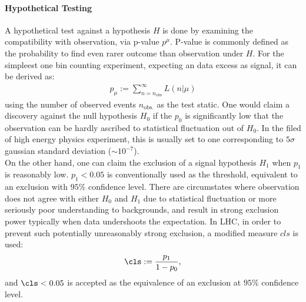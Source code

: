 \paragraph{Hypothetical Testing}
A hypothetical test against a hypothesis $H$ is done by examining the compatibility with observation, via p-value $p^\mu$.
P-value is commonly defined as the probability to find even rarer outcome than observation under $H$. 
For the simpleest one bin counting experiment, expecting an data excess as signal, it can be derived as:
\begin{align}
p_\mu := \sum_{n=n_{\mathrm{obs}}}^{\infty} L(n|\mu) 
\end{align}
using the number of observed events $n_{\mathrm{obs.}}$ as the test static.
One would claim a discovery against the null hypothesis $H_0$ if the $p_0$ is significantly low that the observation can be hardly ascribed to statistical fluctuation out of $H_0$. In the filed of high energy physics experiment, this is usually set to one corresponding to $5\sigma$ gaussian standard deviation ($\sim 10^{-7}$). \\

On the other hand, one can claim the exclusion of a signal hypothesis $H_1$ when $p_1$ is reasonably low. $p_1<0.05$ is conventionally used as the threshold, equivalent to an exclusion with $95\%$ confidence level. There are circumstates where observation does not agree with either $H_0$ and $H_1$ due to statistical fluctuation or more seriously poor understanding to backgrounds, and result in strong exclusion power typically when data undershoots the expectation. In LHC, in order to prevent such potentially unreasonably strong exclusion, a modified measure $cls$ is used:
\begin{align}
\cls := \frac{p_1}{1-p_0},
\end{align}
and $\cls<0.05$ is accepted as the equivalence of an exclusion at $95\%$ confidence level. \\

